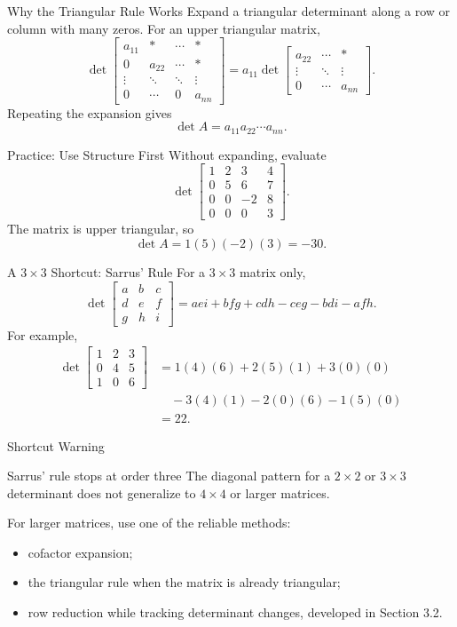 \begin{frame}{Why the Triangular Rule Works}
Expand a triangular determinant along a row or column with many zeros.
For an upper triangular matrix,
\[
\det\begin{bmatrix}
a_{11}&*&\cdots&*\\
0&a_{22}&\cdots&*\\
\vdots&\ddots&\ddots&\vdots\\
0&\cdots&0&a_{nn}
\end{bmatrix}
=a_{11}\det\begin{bmatrix}
a_{22}&\cdots&*\\
\vdots&\ddots&\vdots\\
0&\cdots&a_{nn}
\end{bmatrix}.
\]
Repeating the expansion gives
\[
\det A=a_{11}a_{22}\cdots a_{nn}.
\]
\end{frame}

\begin{frame}{Practice: Use Structure First}
Without expanding, evaluate
\[
\det\begin{bmatrix}
1&2&3&4\\
0&5&6&7\\
0&0&-2&8\\
0&0&0&3
\end{bmatrix}.
\]
\pause
The matrix is upper triangular, so
\[
\boxed{\det A=1(5)(-2)(3)=-30}.
\]
\end{frame}

\begin{frame}{A $3\times3$ Shortcut: Sarrus' Rule}
For a $3\times3$ matrix only,
\[
\det\begin{bmatrix}a&b&c\\d&e&f\\g&h&i\end{bmatrix}
=aei+bfg+cdh-ceg-bdi-afh.
\]
\pause
For example,
\begin{align*}
\det\begin{bmatrix}1&2&3\\0&4&5\\1&0&6\end{bmatrix}
&=1(4)(6)+2(5)(1)+3(0)(0)\\
&\quad-3(4)(1)-2(0)(6)-1(5)(0)\\
&=22.
\end{align*}
\end{frame}

\begin{frame}{Shortcut Warning}
\begin{alertblock}{Sarrus' rule stops at order three}
The diagonal pattern for a $2\times2$ or $3\times3$ determinant does not generalize to $4\times4$ or larger matrices.
\end{alertblock}
\pause
For larger matrices, use one of the reliable methods:
\begin{itemize}
  \item cofactor expansion;
  \item the triangular rule when the matrix is already triangular;
  \item row reduction while tracking determinant changes, developed in Section 3.2.
\end{itemize}
\end{frame}

